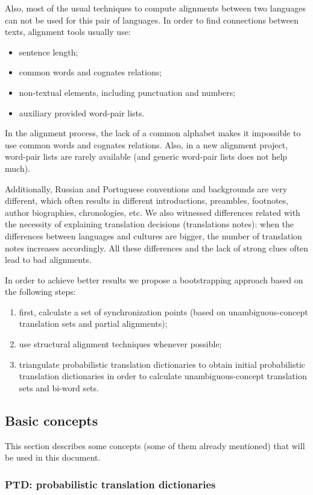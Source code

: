 \documentclass[a4paper,russian,UKenglish]{oasics}
\def\UC{unambiguous-concept}
\def\UCTS{\UC{} translation sets}
\def\PTD{probabilistic translation dictionaries}
\def\BWS{bi-word sets}
\begin{document}
Also, most of the usual techniques to compute alignments between two
languages can not be used for this pair of languages. 
In order to find connections between texts, alignment tools usually use:
\begin{itemize}
\item sentence length;
\item common words and cognates relations;
\item non-textual elements, including punctuation and numbers;
\item auxiliary provided word-pair lists.
\end{itemize}

In the alignment process, the lack of a common alphabet makes it
impossible to use common words and cognates relations. Also, in a new
alignment project, word-pair lists are rarely available (and generic
word-pair lists does not help much).

Additionally, Russian and Portuguese conventions and backgrounds are
very different, which often results in different introductions,
preambles, footnotes, author biographies, chronologies, etc.  We also
witnessed differences related with the necessity of explaining
translation decisions (translations notes): when the differences
between languages and cultures are bigger, the number of translation
notes increases accordingly. All these differences and the lack of
strong clues often lead to bad alignments.

In order to achieve better results we propose a bootstrapping approach
based on the following steps:
\begin{enumerate}
\item first, calculate a set of synchronization points (based on
  \UCTS{} and partial alignments);
\item use structural alignment techniques whenever possible;
\item triangulate \PTD{} to obtain initial \PTD{} in order to
  calculate \UCTS{} and \BWS.
\end{enumerate}

\subsection{Basic concepts}

This section describes some concepts (some of them already mentioned)
that will be used in this document.

\subsubsection*{PTD:  \PTD}
\end{document}
